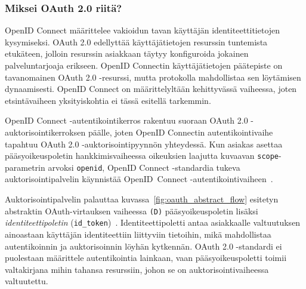 \documentclass[finnish,gradu]{tktltiki}
\begin{document}
%


  \subsubsection{Miksei OAuth 2.0 riitä?} %
  \label{ssub:miksei_oauth_riita}

  OpenID Connect määrittelee vakioidun tavan käyttäjän identiteettitietojen kysymiseksi. OAuth 2.0 edellyttää käyttäjätietojen resurssin tuntemista etukäteen, jolloin resurssin asiakkaan täytyy konfiguroida jokainen palveluntarjoaja erikseen. OpenID Connectin käyttäjätietojen päätepiste on tavanomainen OAuth 2.0 -resurssi, mutta protokolla mahdollistaa sen löytämisen dynaamisesti. OpenID Connect on määrittelyltään kehittyvässä vaiheessa, joten etsintävaiheen yksityiskohtia ei tässä esitellä tarkemmin.

  OpenID Connect -autentikointikerros rakentuu suoraan OAuth 2.0 -auktorisointi\-kerroksen päälle, joten OpenID Connectin autentikointivaihe tapahtuu OAuth 2.0 -auktorisointi\-pyynnön yhteydessä. Kun asiakas asettaa pääsyoikeuspoletin hankkimisvaiheessa oikeuksien laajutta kuvaavan \verb!scope!-para\-metrin arvoksi \verb!openid!, \mbox{OpenID} Connect -stan\-dar\-dia tukeva auktorisointipalvelin käynnistää \mbox{OpenID Connect} -au\-ten\-ti\-kointi\-vaiheen~\cite{sakimura_openid_c_nutshell_2012}.

  Auktorisointipalvelin palauttaa kuvassa~\ref{fig:oauth_abstract_flow} esitetyn abstraktin OAuth-virtauksen vaiheessa \verb!(D)! pääsyoikeuspoletin lisäksi \emph{identiteettipoletin} (\verb!id_token!)~\cite{bradley_openid_c_id_token_2012}. Identiteettipoletti antaa asiakkaalle valtuutuksen ainoastaan käyttäjän identiteettiin liittyviin tietoihin, mikä mahdollistaa autentikoinnin ja auktorisoinnin löyhän kytkennän. OAuth 2.0 -standardi ei puolestaan määrittele autentikointia lainkaan, vaan pääsyoikeuspoletti toimii valtakirjana mihin tahansa resurssiin, johon se on auktorisointivaiheessa valtuutettu.
\end{document}

